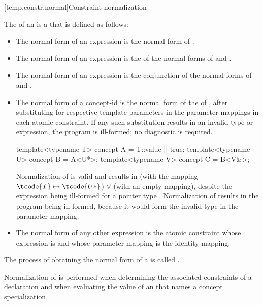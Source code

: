 [temp.constr.normal]{Constraint normalization}

\pnum
The  of an   is
a  that is defined as follows:
%
\begin{itemize}
\item
The normal form of an expression  is
the normal form of .

\item
The normal form of an expression  is
the  of
the normal forms of  and .

\item
The normal form of an expression 
is the conjunction of
the normal forms of  and .

\item
The normal form of a concept-id 
is the normal form of the  of ,
after substituting  for
 respective template parameters in the
parameter mappings in each atomic constraint.
If any such substitution results in an invalid type or expression,
the program is ill-formed; no diagnostic is required.
\begin{example}
\begin{codeblock}
template<typename T> concept A = T::value || true;
template<typename U> concept B = A<U*>;
template<typename V> concept C = B<V&>;
\end{codeblock}
Normalization of  
is valid and results in
 (with the mapping $\tcode{T} \mapsto \tcode{U*}$)
$\lor$
 (with an empty mapping),
despite the expression  being ill-formed
for a pointer type .
Normalization of  
results in the program being ill-formed,
because it would form the invalid type 
in the parameter mapping.
\end{example}

\item
The normal form of any other expression  is
the atomic constraint
whose expression is  and
whose parameter mapping is the identity mapping.
\end{itemize}

\pnum
{}%
The process of obtaining the normal form of a
is called
.
\begin{note}
Normalization of 
is performed
when determining the associated constraints
of a declaration
and
when evaluating the value of an 
that names a concept specialization.
\end{note}

